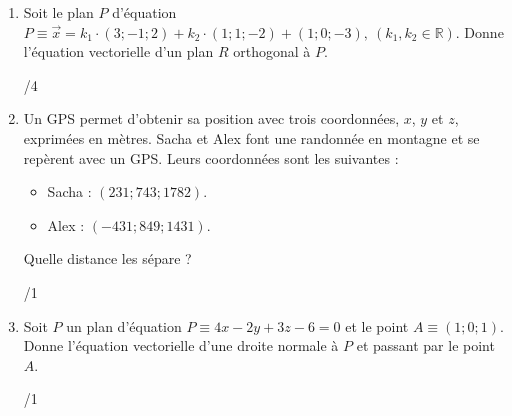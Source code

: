 \begin{enumerate}
		\item 
			\begin{minipage}[t]{.9\textwidth}
				Soit le plan $P$ d'équation $P \equiv \vec{x} = k_1 \cdot \left(3; -1; 2\right) + k_2 \cdot \left(1; 1; -2\right) + \left(1; 0; -3\right), ~(k_1, k_2 \in \mathbb{R})$. Donne l'équation vectorielle d'un plan $R$ orthogonal à $P$.
			\end{minipage}%
			\begin{minipage}{.1\textwidth}
				\begin{flushright}
					{\large /4}
				\end{flushright}
			\end{minipage}
			\vspace{1em}
			
		\item 
			\begin{minipage}[t]{.9\textwidth}
				Un GPS permet d'obtenir sa position avec trois coordonnées, $x$, $y$ et $z$, exprimées en mètres. Sacha et Alex font une randonnée en montagne et se repèrent avec un GPS. Leurs coordonnées sont les suivantes :
				\begin{itemize}
					\item Sacha : $\left(231; 743; 1782\right)$.
					\item Alex : $\left(-431; 849; 1431\right)$.
				\end{itemize}
			Quelle distance les sépare ?
			\end{minipage}%
			\begin{minipage}{.1\textwidth}
				\begin{flushright}
					{\large /1}
				\end{flushright}
			\end{minipage}
			\vspace{1em}
			
		\item 
			\begin{minipage}[t]{.9\textwidth}
				Soit $P$ un plan d'équation $P \equiv 4x -2y + 3z - 6 = 0$ et le point $A \equiv \left(1; 0; 1\right)$. Donne l'équation vectorielle d'une droite normale à $P$ et passant par le point $A$.
			\end{minipage}%
			\begin{minipage}{.1\textwidth}
				\begin{flushright}
					{\large /1}
				\end{flushright}
			\end{minipage}
			\vspace{1em}
			

\end{enumerate}
